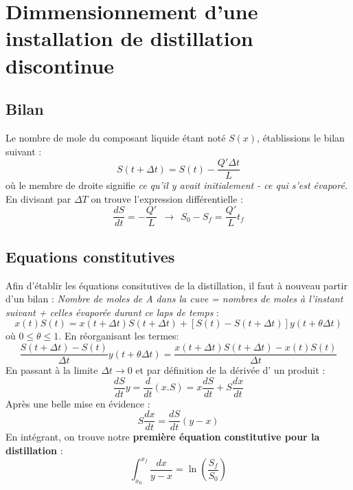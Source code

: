 \documentclass[11pt, a4paper, openany]{book}
\begin{document}
\section{Dimmensionnement d'une installation de distillation discontinue}
	\subsection{Bilan}
	Le nombre de mole du composant liquide étant noté $S(x)$, établissions le bilan
	suivant :
	\begin{equation}
	S(t+\Delta t) = S(t)-\frac{Q'\Delta t}{L}
	\end{equation}
	où le membre de droite signifie \textit{ce qu'il y avait initialement - ce qui s'est 
	évaporé.} En divisant par $\Delta T$ on trouve l'expression différentielle :
	\begin{equation}
	\frac{dS}{dt} = -\frac{Q'}{L}\ \ \rightarrow\ \ S_0-S_f = \frac{Q'}{L}t_f
	\end{equation}
	
	\subsection{Equations constitutives}
	Afin d'établir les équations consitutives de la distillation, il faut à nouveau 
	partir d'un bilan : \textit{Nombre de moles de A dans la cuve = nombres de moles 
	à l'instant suivant + celles évaporée durant ce laps de temps} :
	\begin{equation}
	x(t)S(t) = x(t+\Delta t)S(t+\Delta t) + \left[S(t)-S(t+\Delta t)\right]y(t+\theta
	\Delta t)
	\end{equation}
	où $0\leq\theta\leq 1$. En réorganisant les termes:
	\begin{equation}
	\frac{S(t+\Delta t) -S(t)}{\Delta t}y(t+\theta\Delta t) = \frac{x(t+\Delta t)S(t+
	\Delta t) - x(t)S(t)}{\Delta t}
	\end{equation}
	En passant à la limite $\Delta t \rightarrow 0$ et par définition de la dérivée d'
	un produit :
	\begin{equation}
	\frac{dS}{dt}y = \frac{d}{dt}(x.S) = x\frac{dS}{dt} + S\frac{dx}{dt}
	\end{equation}
	Après une belle mise en évidence : 
	\begin{equation}
	S\frac{dx}{dt} = \frac{dS}{dt}(y-x)
	\end{equation}
	En intégrant, on trouve notre \textbf{première équation constitutive pour la 
	distillation} :
	\begin{equation}
	\int_{x_0}^{x_f} \dfrac{dx}{y-x} = \ln\left(\dfrac{S_f}{S_0}\right)
	\end{equation}
	
\end{document}
